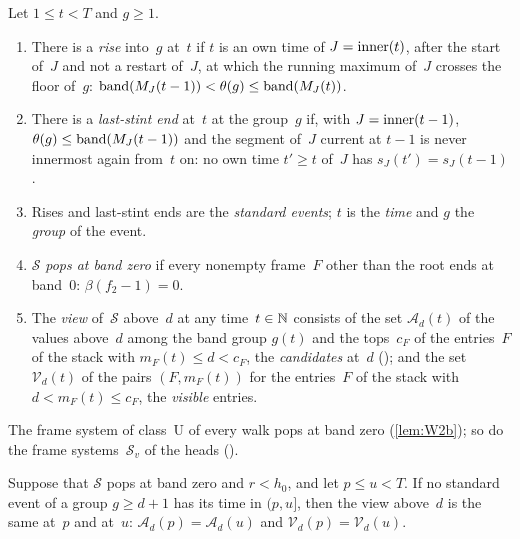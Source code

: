 \begin{definition}\label{def:view}
Let $1\le t<T$ and $g\ge1$.
\begin{enumerate}[label=(\alph*)]
\item There is a \emph{rise} into~$g$ at~$t$ if $t$ is an own time of $J=\operatorname{inner}(t)$, after the start of~$J$ and not a restart
of~$J$, at which the running maximum of~$J$ crosses the floor of~$g$:
$\operatorname{band}(M_J(t-1))<\theta(g)\le\operatorname{band}(M_J(t))$.
\item There is a \emph{last-stint end} at~$t$ at the group~$g$ if, with $J=\operatorname{inner}(t-1)$, $\theta(g)\le\operatorname{band}(M_J(t-1))$ and the
segment of~$J$ current at $t-1$ is never innermost again from~$t$ on: no own time $t'\ge t$ of~$J$ has $s_J(t')=s_J(t-1)$.
\item Rises and last-stint ends are the \emph{standard events}; $t$ is the \emph{time} and $g$ the \emph{group} of the event.
\item $\mathcal S$ \emph{pops at band zero} if every nonempty frame~$F$ other than the root ends at band~$0$: $\beta(f_2-1)=0$.
\item The \emph{view} of~$\mathcal S$ above~$d$ at any time~$t\in\mathbb{N}$ consists of the set $\mathcal A_d(t)$ of the values above~$d$ among the band group
$g(t)$ and the tops~$c_F$ of the entries~$F$ of the stack with $m_F(t)\le d<c_F$, the \emph{candidates} at~$d$
(); and the set $\mathcal V_d(t)$ of the pairs $(F,m_F(t))$ for the entries~$F$ of the stack with
$d<m_F(t)\le c_F$, the \emph{visible} entries.
\end{enumerate}
\end{definition}

The frame system of class~U of every walk pops at band zero (\cref{lem:W2b}); so do the frame systems~$\mathcal S_v$ of the heads
().

\begin{proposition}\label{prop:W}
Suppose that $\mathcal S$ pops at band zero and $r<h_0$, and let $p\le u<T$. If no standard event of a group $g\ge d+1$ has its time in
$(p,u]$, then the view above~$d$ is the same at~$p$ and at~$u$: $\mathcal A_d(p)=\mathcal A_d(u)$ and $\mathcal V_d(p)=\mathcal V_d(u)$.
\end{proposition}

